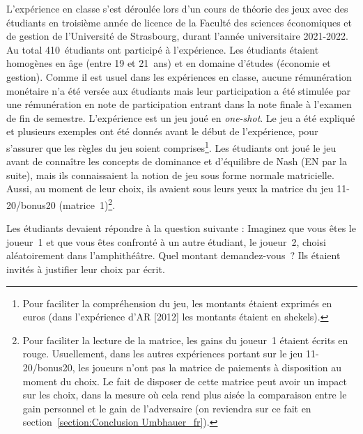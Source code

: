 \begin{Article}
\begin{refsection}[UmbhauerFR]
L'expérience en classe s'est déroulée lors d'un cours de théorie des
jeux avec des étudiants en troisième année de licence de la Faculté des
sciences économiques et de gestion de l'Université de Strasbourg, durant
l'année universitaire 2021-2022. Au total 410~étudiants ont participé à
l'expérience. Les étudiants étaient homogènes en âge (entre 19 et 21~ans) et en domaine d'études (économie et gestion). Comme il est usuel
dans les expériences en classe, aucune rémunération monétaire n'a été
versée aux étudiants mais leur participation a été stimulée par une
rémunération en note de participation entrant dans la note finale à
l'examen de fin de semestre. L'expérience est un jeu joué en
\emph{one-shot}. Le jeu a été expliqué et plusieurs exemples ont été
donnés avant le début de l'expérience, pour s'assurer que les règles du
jeu soient comprises\footnote{Pour faciliter la compréhension du jeu,
  les montants étaient exprimés en euros (dans l'expérience
  d'AR [2012] les montants étaient en shekels).}. Les étudiants ont
joué le jeu avant de connaître les concepts de dominance et d'équilibre
de Nash (EN par la suite), mais ils connaissaient la notion de jeu sous
forme normale matricielle. Aussi, au moment de leur choix, ils avaient
sous leurs yeux la matrice du jeu 11-20/bonus20 (matrice~1)\footnote{Pour
  faciliter la lecture de la matrice, les gains du joueur~1 étaient
  écrits en rouge. Usuellement, dans les autres expériences portant sur
  le jeu 11-20/bonus20, les joueurs n'ont pas la matrice de paiements à
  disposition au moment du choix. Le fait de disposer de cette matrice
  peut avoir un impact sur les choix, dans la mesure où cela rend plus
  aisée la comparaison entre le gain personnel et le gain de
  l'adversaire (on reviendra sur ce fait en section~\ref{section:Conclusion Umbhauer_fr}).}.

Les étudiants devaient répondre à la question suivante :
\og{}Imaginez que vous êtes le joueur~1 et que vous êtes confronté à
un autre étudiant, le joueur~2, choisi aléatoirement dans
l'amphithéâtre. Quel montant demandez-vous~?\fg{} Ils étaient invités à
justifier leur choix par écrit.


\end{refsection}
\end{Article}
